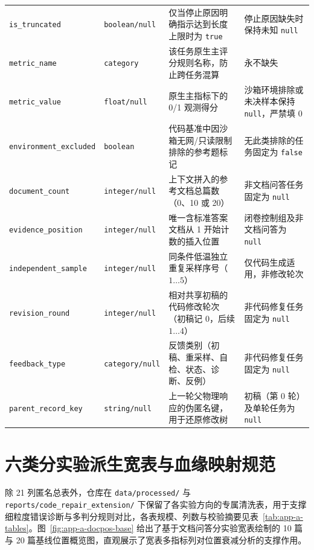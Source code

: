 {\begin{longtable}{@{}>{\raggedright\arraybackslash}p{3.3cm} >{\raggedright\arraybackslash}p{2.2cm} >{\raggedright\arraybackslash}p{4.6cm} >{\raggedright\arraybackslash}p{4.3cm}@{}}
\texttt{is\_truncated} & \texttt{boolean/null} & 仅当停止原因明确指示达到长度上限时为 \texttt{true} & 停止原因缺失时保持未知 \texttt{null} \\
\texttt{metric\_name} & \texttt{category} & 该任务原生主评分规则名称，防止跨任务混算 & 永不缺失 \\
\texttt{metric\_value} & \texttt{float/null} & 原生主指标下的 0/1 观测得分 & 沙箱环境排除或未决样本保持 \texttt{null}，严禁填 0 \\
\texttt{environment\_excluded} & \texttt{boolean} & 代码基准中因沙箱无网/只读限制排除的参考题标记 & 无此类排除的任务固定为 \texttt{false} \\
\texttt{document\_count} & \texttt{integer/null} & 上下文拼入的参考文档总篇数（0、10 或 20） & 非文档问答任务固定为 \texttt{null} \\
\texttt{evidence\_position} & \texttt{integer/null} & 唯一含标准答案文档从 1 开始计数的插入位置 & 闭卷控制组及非文档问答为 \texttt{null} \\
\texttt{independent\_sample} & \texttt{integer/null} & 同条件低温独立重复采样序号（$1\dots 5$） & 仅代码生成适用，非修改轮次 \\
\texttt{revision\_round} & \texttt{integer/null} & 相对共享初稿的代码修改轮次（初稿记 0，后续 $1\dots 4$） & 非代码修复任务固定为 \texttt{null} \\
\texttt{feedback\_type} & \texttt{category/null} & 反馈类别（初稿、重采样、自检、状态、诊断、反例） & 非代码修复任务固定为 \texttt{null} \\
\texttt{parent\_record\_key} & \texttt{string/null} & 上一轮父物理响应的伪匿名键，用于还原修改树 & 初稿（第 0 轮）及单轮任务为 \texttt{null} \\
\end{longtable}}

\section{六类分实验派生宽表与血缘映射规范}

除 21 列匿名总表外，仓库在 \texttt{data/processed/} 与 \texttt{reports/code\_repair\_extension/} 下保留了各实验方向的专属清洗表，用于支撑细粒度错误诊断与多判分规则对比，各表规模、列数与校验摘要见表~\ref{tab:app-a-tables}。图~\ref{fig:app-a-docpos-base} 给出了基于文档问答分实验宽表绘制的 10 篇与 20 篇基线位置概览图，直观展示了宽表多指标列对位置衰减分析的支撑作用。

